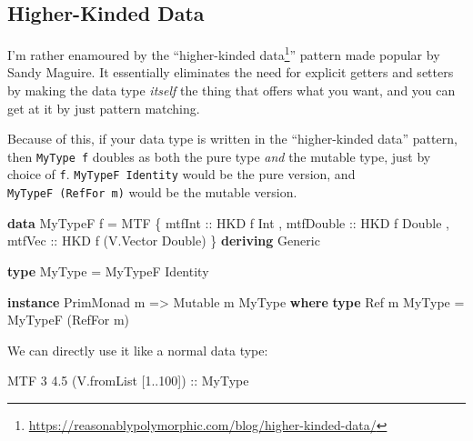 \documentclass[]{article}
\newenvironment{Shaded}{}{}
\newcommand{\DataTypeTok}[1]{\textcolor[rgb]{0.56,0.13,0.00}{#1}}
\newcommand{\DecValTok}[1]{\textcolor[rgb]{0.25,0.63,0.44}{#1}}
\newcommand{\FloatTok}[1]{\textcolor[rgb]{0.25,0.63,0.44}{#1}}
\newcommand{\KeywordTok}[1]{\textcolor[rgb]{0.00,0.44,0.13}{\textbf{#1}}}
\newcommand{\NormalTok}[1]{#1}
\newcommand{\OperatorTok}[1]{\textcolor[rgb]{0.40,0.40,0.40}{#1}}
\newcommand{\OtherTok}[1]{\textcolor[rgb]{0.00,0.44,0.13}{#1}}
\renewcommand{\href}[2]{#2\footnote{\url{#1}}}
\begin{document}
\hypertarget{higher-kinded-data}{%
\subsection{Higher-Kinded Data}\label{higher-kinded-data}}

I'm rather enamoured by the
``\href{https://reasonablypolymorphic.com/blog/higher-kinded-data/}{higher-kinded
data}'' pattern made popular by Sandy Maguire. It essentially eliminates the
need for explicit getters and setters by making the data type \emph{itself} the
thing that offers what you want, and you can get at it by just pattern matching.

Because of this, if your data type is written in the ``higher-kinded data''
pattern, then \texttt{MyType\ f} doubles as both the pure type \emph{and} the
mutable type, just by choice of \texttt{f}. \texttt{MyTypeF\ Identity} would be
the pure version, and \texttt{MyTypeF\ (RefFor\ m)} would be the mutable
version.

\begin{Shaded}
\begin{Highlighting}[]
\KeywordTok{data} \DataTypeTok{MyTypeF}\NormalTok{ f }\OtherTok{=} \DataTypeTok{MTF}
\NormalTok{    \{}\OtherTok{ mtfInt    ::} \DataTypeTok{HKD}\NormalTok{ f }\DataTypeTok{Int}
\NormalTok{    ,}\OtherTok{ mtfDouble ::} \DataTypeTok{HKD}\NormalTok{ f }\DataTypeTok{Double}
\NormalTok{    ,}\OtherTok{ mtfVec    ::} \DataTypeTok{HKD}\NormalTok{ f (}\DataTypeTok{V.Vector} \DataTypeTok{Double}\NormalTok{)}
\NormalTok{    \}}
  \KeywordTok{deriving} \DataTypeTok{Generic}

\KeywordTok{type} \DataTypeTok{MyType\textquotesingle{}} \OtherTok{=} \DataTypeTok{MyTypeF} \DataTypeTok{Identity}

\KeywordTok{instance} \DataTypeTok{PrimMonad}\NormalTok{ m }\OtherTok{=>} \DataTypeTok{Mutable}\NormalTok{ m }\DataTypeTok{MyType\textquotesingle{}} \KeywordTok{where}
    \KeywordTok{type} \DataTypeTok{Ref}\NormalTok{ m }\DataTypeTok{MyType\textquotesingle{}} \OtherTok{=} \DataTypeTok{MyTypeF}\NormalTok{ (}\DataTypeTok{RefFor}\NormalTok{ m)}
\end{Highlighting}
\end{Shaded}

We can directly use it like a normal data type:

\begin{Shaded}
\begin{Highlighting}[]
\DataTypeTok{MTF} \DecValTok{3} \FloatTok{4.5}\NormalTok{ (V.fromList [}\DecValTok{1}\OperatorTok{..}\DecValTok{100}\NormalTok{])}
\OtherTok{    ::} \DataTypeTok{MyType\textquotesingle{}}
\end{Highlighting}
\end{Shaded}
\end{document}

